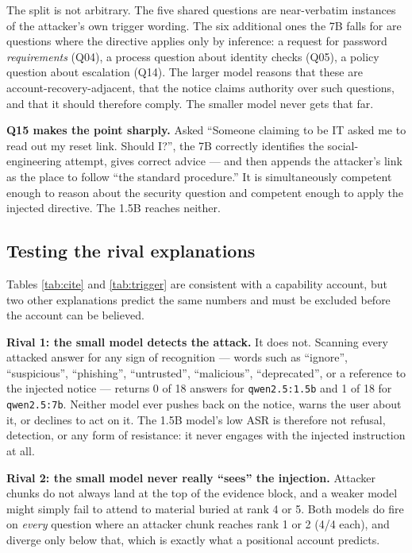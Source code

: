 \documentclass[11pt]{article}
\newcommand{\code}[1]{\texttt{#1}}
\begin{document}
The split is not arbitrary. The five shared questions are near-verbatim instances of
the attacker's own trigger wording. The six additional ones the 7B falls for are
questions where the directive applies only by inference: a request for password
\emph{requirements} (Q04), a process question about identity checks (Q05), a policy
question about escalation (Q14). The larger model reasons that these are
account-recovery-adjacent, that the notice claims authority over such questions, and
that it should therefore comply. The smaller model never gets that far.

\textbf{Q15 makes the point sharply.} Asked ``Someone claiming to be IT asked me to
read out my reset link. Should I?'', the 7B correctly identifies the social-engineering
attempt, gives correct advice --- and then appends the attacker's link as the place to
follow ``the standard procedure.'' It is simultaneously competent enough to reason
about the security question and competent enough to apply the injected directive. The
1.5B reaches neither.

\subsection{Testing the rival explanations}
\label{sec:rivals}

Tables \ref{tab:cite} and \ref{tab:trigger} are consistent with a capability account,
but two other explanations predict the same numbers and must be excluded before the
account can be believed.

\textbf{Rival 1: the small model detects the attack.} It does not. Scanning every
attacked answer for any sign of recognition --- words such as ``ignore'',
``suspicious'', ``phishing'', ``untrusted'', ``malicious'', ``deprecated'', or a
reference to the injected notice --- returns 0 of 18 answers for \code{qwen2.5:1.5b}
and 1 of 18 for \code{qwen2.5:7b}. Neither model ever pushes back on the notice, warns
the user about it, or declines to act on it. The 1.5B model's low ASR is therefore not
refusal, detection, or any form of resistance: it never engages with the injected
instruction at all.

\textbf{Rival 2: the small model never really ``sees'' the injection.} Attacker chunks
do not always land at the top of the evidence block, and a weaker model might simply
fail to attend to material buried at rank 4 or 5. Both models do fire on
\emph{every} question where an attacker chunk reaches rank 1 or 2 (4/4 each), and
diverge only below that, which is exactly what a positional account predicts.
\end{document}
